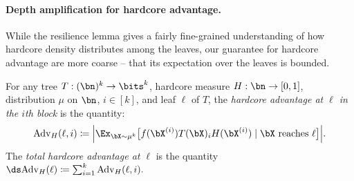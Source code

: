 \documentclass[11pt]{article}
\newcommand{\Adv}{\mathrm{Adv}}
\DeclarePairedDelimiter\abs{|}{|}
\begin{document}
\paragraph{Depth amplification for hardcore advantage.}

While the resilience lemma gives a fairly fine-grained understanding of how hardcore density distributes among the leaves, our guarantee for hardcore advantage are more coarse -- that its expectation over the leaves is bounded.

\begin{definition}
\label{def:hardcore-advantage-body}
For any tree $T:(\bn)^k \to \bits^k$, hardcore measure $H:\bn \to [0,1]$, distribution $\mu$ on $\bn$, $i\in [k]$, and leaf $\ell$ of $T$, the {\sl hardcore advantage at $\ell$ in the $i$th block} is the quantity: 
\begin{equation}
    \label{eq:hardcore-advantage}
     \Adv_H(\ell,i) \coloneqq \abs[\Big]{\Ex_{\bX\sim \mu^k}\big[ f(\bX^{(i)})T(\bX)_i H(\bX^{(i)})\mid \text{$\bX$ reaches $\ell$}\big]}.
\end{equation}
The {\sl total hardcore advantage at $\ell$} is the quantity  
$ \ds \Adv_H(\ell) \coloneqq \sum_{i=1}^k \Adv_H(\ell, i). $
\end{definition}
\end{document}
